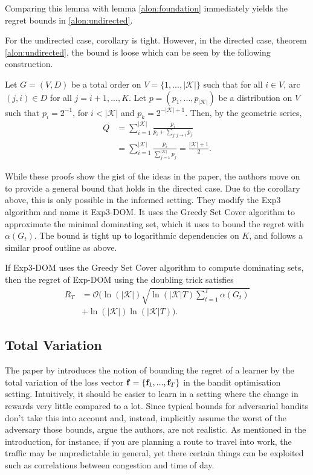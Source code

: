 Comparing this lemma with lemma \ref{alon:foundation} immediately yields the regret bounds in \ref{alon:undirected}.

For the undirected case, corollary \label{alon:corollary} is tight. However, in the directed case, theorem \ref{alon:undirected}, the bound is loose which can be seen by the following construction. 

\begin{corollary}
	Let $G=(V,D)$ be a total order on $V=\{1,...,|\mathcal{K}|\}$ such that for all $i\in V$, arc $(j,i)\in D$ for all $j=i+1,...,K$. Let $p=(p_1,...,p_{|\mathcal{K}|})$ be a distribution on $V$ such that $p_i=2^{-1}$, for $i< |\mathcal{K}|$ and $p_k=2^{-|\mathcal{K}|+1}$. Then, by the geometric series,
	\begin{align*}
		Q&=\sum_{i=1}^{|\mathcal{K}|}\frac{p_i}{p_i+\sum_{j:j\to i}p_j}\\
		 &=\sum_{i=1}^{|\mathcal{K}|}\frac{p_i}{\sum_{j=1}^{|\mathcal{K}|}p_j}=\frac{|\mathcal{K}|+1}{2}.
	\end{align*}
\end{corollary} 

While these proofs show the gist of the ideas in the paper, the authors move on to provide a general bound that holds in the directed case. Due to the corollary above, this is only possible in the informed setting. They modify the Exp3 algorithm and name it Exp3-DOM. It uses the Greedy Set Cover algorithm to approximate the minimal dominating set, which it uses to bound the regret with $\alpha(G_t)$. The bound is tight up to logarithmic dependencies on $K$, and follows a similar proof outline as above. 

\begin{theorem}
	If Exp3-DOM uses the Greedy Set Cover algorithm to compute dominating sets, then the regret of Exp-DOM using the doubling trick satisfies
	\begin{align*}
		R_T&=\mathcal{O}\bigg(\ln(|\mathcal{K}|)\sqrt{\ln(|\mathcal{K}| T)\sum_{t=1}^T\alpha(G_t)}\\
		&+\ln(|\mathcal{K}|)\ln(|\mathcal{K}|T)\bigg).
	\end{align*}
\end{theorem}


\subsection{Total Variation}
The paper by \citep{hazan} introduces the notion of bounding the regret of a learner by the total variation of the loss vector ${\bf f}=\{{\bf f}_1,...,{\bf f}_T\}$ in the bandit optimisation setting. Intuitively, it should be easier to learn in a setting where the change in rewards very little compared to a lot. Since typical bounds for adversarial bandits don't take this into account and, instead, implicitly assume the worst of the adversary those bounds, argue the authors, are not realistic. As mentioned in the introduction, for instance, if you are planning a route to travel into work, the traffic may be unpredictable in general, yet there certain things can be exploited such as correlations between congestion and time of day.

